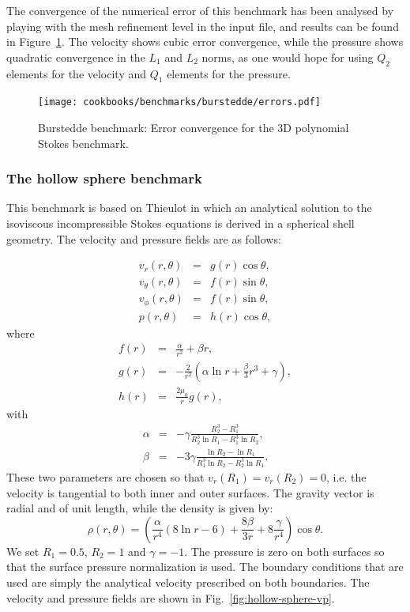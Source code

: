 \documentclass{article}
\begin{document}
The convergence of the numerical error of this benchmark has been analysed by
playing with the mesh refinement level in the input file, and
results can be found in Figure~\ref{errors}. The velocity shows cubic error
convergence, while the pressure shows quadratic convergence in the $L_1$ and
$L_2$ norms, as one would hope for using $Q_2$ elements for the velocity and
$Q_1$ elements for the pressure.

\begin{figure}[tbp]
  \centering
  \texttt{[image: cookbooks/benchmarks/burstedde/errors.pdf]}
  \caption{Burstedde benchmark: Error convergence for the 3D polynomial Stokes
    benchmark.
    \label{errors}}
\end{figure}


\subsubsection{The hollow sphere benchmark}

\label{sec:cookbooks-hollow-sphere}

This benchmark is based on Thieulot \cite{THIE17} in which an analytical solution to the
isoviscous incompressible Stokes equations is derived in a spherical shell geometry.
The velocity and pressure fields are as follows:

\begin{eqnarray}
v_r(r,\theta)      &=& g(r) \cos \theta, \\
v_\theta(r,\theta) &=& f(r) \sin \theta, \\
v_\phi(r,\theta)   &=& f(r) \sin \theta, \\
p(r,\theta)        &=& h(r) \cos \theta ,
\end{eqnarray}
where
\begin{eqnarray}
f(r) &=& \frac{\alpha}{r^2} + \beta r, \\
g(r) &=& -\frac{2}{r^2} \left(  \alpha \ln r + \frac{\beta}{3}  r^3  + \gamma \right),   \\
h(r) &=& \frac{2\mu_0}{r} g(r),
\end{eqnarray}
with
\begin{eqnarray}
\alpha&=&-\gamma \frac{R_2^3-R_1^3}{R_2^3 \ln R_1 - R_1^3 \ln R_2}, \\
\beta &=& -3\gamma \frac{\ln R_2 - \ln R_1  }{R_1^3 \ln R_2 - R_2^3 \ln R_1}.
\end{eqnarray}
These two parameters are chosen so that $v_r(R_1)=v_r(R_2)=0$, i.e.
the velocity is tangential to both inner and outer surfaces.
The gravity vector is radial and of unit length, while the density is given by:
\begin{equation}
\rho(r,\theta)=  \left(   \frac{\alpha}{r^4}  (8 \ln r -6) +  \frac{8\beta}{3r}  +8 \frac{\gamma}{r^4}  \right) \cos\theta.
\end{equation}
We set $R_1=0.5$, $R_2=1$ and $\gamma=-1$. The pressure is zero on both surfaces so that 
the surface pressure normalization is used. The boundary conditions that are used are simply 
the analytical velocity prescribed on both boundaries.
The velocity and pressure fields are shown in Fig.~\ref{fig:hollow-sphere-vp}.
\end{document}
